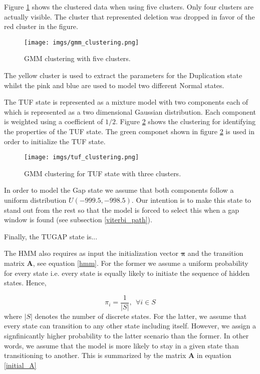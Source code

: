 Figure \ref{gmm_clustering} shows the clustered data when using five clusters. Only four clusters are actually visible. The cluster that represented deletion was dropped in favor of the  red cluster in the figure.  

\begin{figure}[!htb]
	\begin{center}
		\texttt{[image: imgs/gmm\_clustering.png]}
	\end{center}
	\caption{GMM clustering with five clusters.}
	\label{gmm_clustering}
\end{figure}  

The yellow cluster is used to extract the parameters for the Duplication state whilst the pink and blue are used to model two different Normal states.

The TUF state is represented as a mixture model with two components each of which is represented as a two dimensional Gaussian distribution. Each component is weighted using a coefficient of $1/2$.  Figure \ref{tuf_clustering} shows the clustering for identifying the properties of the TUF state. The green componet shown in figure \ref{tuf_clustering} is used in order to initialize the TUF state.


\begin{figure}[!htb]
	\begin{center}
		\texttt{[image: imgs/tuf\_clustering.png]}
	\end{center}
	\caption{GMM clustering for TUF state with three clusters.}
	\label{tuf_clustering}
\end{figure} 

In order to model the Gap state we assume that both components follow a uniform distribution $U(-999.5, -998.5)$. Our intention is to make this state to stand out from the rest so that the model is forced to  select this when a gap window is found (see subsection \ref{viterbi_path}).
 
Finally, the TUGAP state is... 


The HMM also requires as input the initialization vector $\boldsymbol{\pi}$ and the transition matrix $\mathbf{A}$, see equation \ref{hmm}. For the former we assume a uniform probability for every state i.e. every state is equally likely to initiate the sequence of hidden states. Hence, 

\begin{equation}
\pi_i = \frac{1}{|S|}, ~~ \forall i \in S
\end{equation}
where $|S|$ denotes the number of discrete states. For the latter,  we assume that every state can transition to any other state including itself. 
However, we assign a signfinicantly higher probability to the latter
scenario than the former. In other words, we assume that the model is more likely to stay in a given state than transitioning to another. This is summarized by the matrix $\mathbf{A}$ in equation \ref{initial_A}

